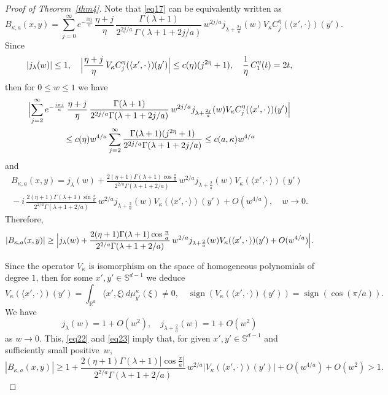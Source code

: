 \documentclass[12pt,twoside,reqno]{amsart}\usepackage[cp1251]{inputenc}
\theoremstyle{plain}
\theoremstyle{remark}
\newcommand\sign{\operatorname{sign}}
\begin{document}
\begin{proof}[Proof of Theorem~\ref{thm4}]
Note that  \eqref{eq17} can be equivalently written as %
\[
B_{\kappa,a}(x,y)
=\sum_{j=0}^{\infty}e^{-\frac{i\pi j}{a}}\,\frac{\eta+j}{\eta}\,\frac{\Gamma(\lambda+1)}{2^{2j/a}\,\Gamma(\lambda+1+2j/a)}\,w^{2j/a}
j_{\lambda+\frac{2j}{a}}(w)V_{\kappa}C_{j}^{\eta}(\langle x',{\cdot}\,\rangle)(y').
\]
Since
\[
|j_{\lambda}(w)|\le 1,\quad \Bigl|\frac{\eta+j}{\eta}\,V_{\kappa}C_j^{\eta}(\langle x',{\cdot}\,\rangle)(y')\Bigr|\le c(\eta)(j^{2\eta}+1),\quad \frac{1}{\eta}\,C_1^{\eta}(t)=2t,
\]
then for $0\le w\le 1$ we have
\begin{multline*}
\Bigl|\sum_{j=2}^{\infty}e^{-\frac{i\pi j}{a}}\,\frac{\eta+j}{\eta}\,\frac{\Gamma(\lambda+1)}{2^{2j/a}\Gamma(\lambda+1+2j/a)}\,w^{2j/a}
j_{\lambda+\frac{2j}{a}}(w)V_{\kappa}C_{j}^{\eta}(\langle
x',{\cdot}\,\rangle)(y')\Bigr|\\
{}\le c(\eta)w^{4/a}\sum_{j=2}^{\infty}\frac{\Gamma(\lambda+1)(j^{2\eta}+1)}{2^{2j/a}\Gamma(\lambda+1+2j/a)}
\le c(a,\kappa)w^{4/a}
\end{multline*}
and
\begin{multline*}
B_{\kappa,a}(x,y)=j_{\lambda}(w)+\frac{2(\eta+1)\Gamma(\lambda+1)\cos\frac{\pi}{a}}{2^{2/a}\Gamma(\lambda+1+2/a)}\,w^{2/a}
j_{\lambda+\frac{2}{a}}(w)V_{\kappa}(\langle x',{\cdot}\,\rangle)(y')\\
{}-i\,\frac{2(\eta+1)\Gamma(\lambda+1)\sin\frac{\pi}{a}}{2^{2/a}\Gamma(\lambda+1+2/a)}\,w^{2/a}
j_{\lambda+\frac{2}{a}}(w)V_{\kappa}(\langle x',{\cdot}\,\rangle)(y')+O(w^{4/a}),\quad w\to 0.
\end{multline*}
Therefore,
\begin{equation}\label{eq22}
|B_{\kappa,a}(x,y)|\ge \Bigl|j_{\lambda}(w)+\frac{2(\eta+1)\Gamma(\lambda+1)\cos\frac{\pi}{a}}{2^{2/a}\Gamma(\lambda+1+2/a)}\,w^{2/a}
j_{\lambda+\frac{2}{a}}(w)V_{\kappa}(\langle x',{\cdot}\,\rangle)(y')+O(w^{4/a})\Bigr|.
\end{equation}

Since the operator $V_{\kappa}$
is isomorphism on the space of homogeneous polynomials of degree $1$, then for some
  $x',y'\in\mathbb{S}^{d-1}$ we deduce
\begin{equation}\label{eq23}
V_{\kappa}(\langle x',{\cdot}\,\rangle)(y')=\int_{\mathbb{R}^d}\langle x',\xi\rangle\,d\mu_{y'}^{\kappa}(\xi)\neq 0,\quad \sign (V_{\kappa}(\langle x',{\cdot}\,\rangle)(y'))=\sign{}(\cos{}(\pi/a)).
\end{equation}
We have
\[
j_{\lambda}(w)=1+O(w^2),\quad j_{\lambda+\frac{2}{a}}(w)=1+O(w^2)
\]
as $w\to 0$.
This, \eqref{eq22} and \eqref{eq23} imply that, for
given $x',y'\in\mathbb{S}^{d-1}$ and sufficiently small positive~$w$,
\[
|B_{\kappa,a}(x,y)|\ge 1+\frac{2(\eta+1)\Gamma(\lambda+1)|\!\cos\frac{\pi}{a}|}{2^{2/a}\Gamma(\lambda+1+2/a)}\,w^{2/a}
|V_{\kappa}(\langle x',{\cdot}\,\rangle)(y')|+O(w^{4/a})+O(w^2)>1.
\]
\end{proof}
\end{document}

